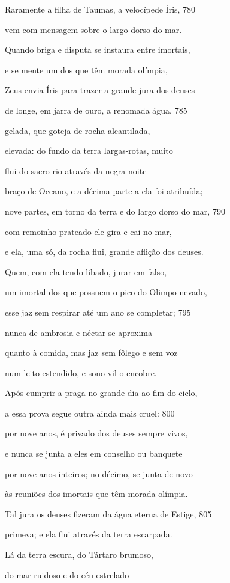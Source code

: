 Raramente a filha de Taumas, a velocípede Íris, \num{780}

vem com mensagem sobre o largo dorso do mar.

Quando briga e disputa se instaura entre imortais,

e se mente um dos que têm morada olímpia,

Zeus envia Íris para trazer a grande jura dos deuses

de longe, em jarra de ouro, a renomada água, \num{785}

gelada, que goteja de rocha alcantilada,

elevada: do fundo da terra largas-rotas, muito

flui do sacro rio através da negra noite --

braço de Oceano, e a décima parte a ela foi atribuída;

nove partes, em torno da terra e do largo dorso do mar, \num{790}

com remoinho prateado ele gira e cai no mar,

e ela, uma só, da rocha flui, grande aflição dos deuses.

Quem, com ela tendo libado, jurar em falso,

um imortal dos que possuem o pico do Olimpo nevado,

esse jaz sem respirar até um ano se completar; \num{795}

nunca de ambrosia e néctar se aproxima

quanto à comida, mas jaz sem fôlego e sem voz

num leito estendido, e sono vil o encobre.

Após cumprir a praga no grande dia ao fim do ciclo,

a essa prova segue outra ainda mais cruel: \num{800}

por nove anos, é privado dos deuses sempre vivos,

e nunca se junta a eles em conselho ou banquete

por nove anos inteiros; no décimo, se junta de novo

às reuniões dos imortais que têm morada olímpia.

Tal jura os deuses fizeram da água eterna de Estige, \num{805}

primeva; e ela flui através da terra escarpada.

\quad{}Lá da terra escura, do Tártaro brumoso,

do mar ruidoso e do céu estrelado

